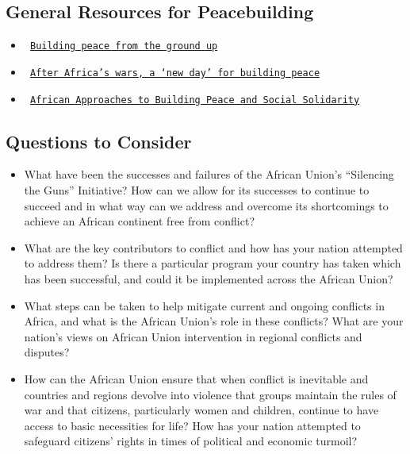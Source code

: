 \documentclass[10pt, letterpaper]{article}
\begin{document}
\subsection{General Resources for Peacebuilding}
  \begin{itemize}
  \item \texttt{
    \href{https://www.un.org/africarenewal/magazine/august-2012/building-peace-ground}{Building peace from the ground up}}
  \item \texttt{
    \href{https://www.un.org/africarenewal/magazine/january-2013/after-africa\%E2\%80\%99s-wars-\%E2\%80\%98new-day\%E2\%80\%99-building-peace}{After Africa’s wars, a ‘new day’ for building peace}}
  \item \texttt{
    \href{https://www.accord.org.za/ajcr-issues/african-approaches-to-building-peace-and-social-solidarity/}{African Approaches to Building Peace and Social Solidarity}}
  \end{itemize}

\subsection{Questions to Consider}

\begin {itemize}

\item
What have been the successes and failures of the African Union's
``Silencing the Guns'' Initiative? How can we allow for its successes to
continue to succeed and in what way can we address and overcome its
shortcomings to achieve an African continent free from conflict?

\item
What are the key contributors to conflict and how has your nation
attempted to address them? Is there a particular program your country
has taken which has been successful, and could it be implemented across
the African Union?

\item
What steps can be taken to help mitigate current and ongoing conflicts
in Africa, and what is the African Union's role in these conflicts? What
are your nation's views on African Union intervention in regional
conflicts and disputes?

\item
How can the African Union ensure that when conflict is inevitable and
countries and regions devolve into violence that groups maintain the
rules of war and that citizens, particularly women and children,
continue to have access to basic necessities for life? How has your
nation attempted to safeguard citizens' rights in times of political and
economic turmoil?

\end{itemize}
\end{document}
